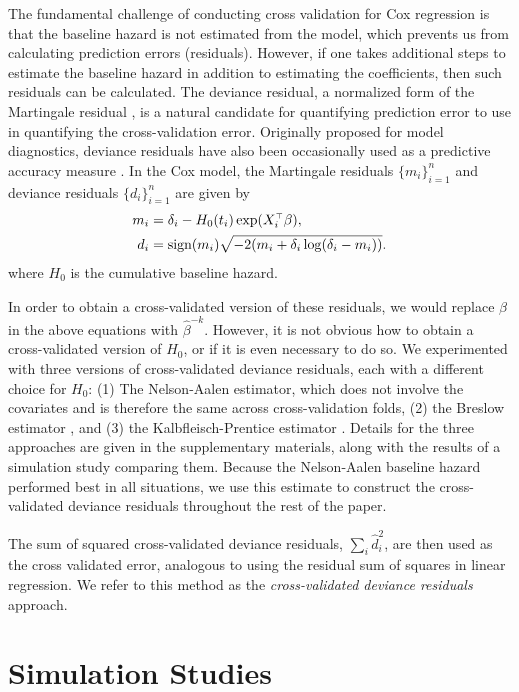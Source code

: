 The fundamental challenge of conducting cross validation for Cox regression is that the baseline hazard is not estimated from the model, which prevents us from calculating prediction errors (residuals).  However, if one takes additional steps to estimate the baseline hazard in addition to estimating the coefficients, then such residuals can be calculated.  The deviance residual, a normalized form of the Martingale residual \citep{Therneau1990}, is a natural candidate for quantifying prediction error to use in quantifying the cross-validation error.   Originally proposed for model diagnostics, deviance residuals have also been occasionally used as a predictive accuracy measure \citep{Therneau2018}.  In the Cox model, the Martingale residuals $\{m_i\}_{i=1}^n$ and deviance residuals $\{d_i\}_{i=1}^n$ are given by
\begin{align}
  \label{eq:res-m}
  m_{i} &= \delta_{i} - H_{0}(t_{i})\exp(X_i^{\scriptscriptstyle\top}\beta), \\
  \label{eq:res-d}
  d_{i} &= \text{sign}(m_{i})\sqrt{-2(m_i + \delta_{i}\log(\delta_{i} - m_i))}.  
\end{align}
where $H_0$ is the cumulative baseline hazard.

In order to obtain a cross-validated version of these residuals, we would replace $\beta$ in the above equations with $\hat{\beta}^{-k}$.  However, it is not obvious how to obtain a cross-validated version of $H_0$, or if it is even necessary to do so.  We experimented with three versions of cross-validated deviance residuals, each with a different choice for $H_0$: (1) The Nelson-Aalen estimator, which does not involve the covariates and is therefore the same across cross-validation folds, (2) the Breslow estimator \citep{Breslow1972}, and (3) the Kalbfleisch-Prentice estimator \citep{Kalbfleisch2011}.  Details for the three approaches are given in the supplementary materials, along with the results of a simulation study comparing them.  Because the Nelson-Aalen baseline hazard performed best in all situations, we use this estimate to construct the cross-validated deviance residuals throughout the rest of the paper.

The sum of squared cross-validated deviance residuals, $\sum_{i}\hat{d}_{i}^2$, are then used as the cross validated error, analogous to using the residual sum of squares in linear regression. We refer to this method as the \emph{cross-validated deviance residuals} approach.

\section{Simulation Studies}

